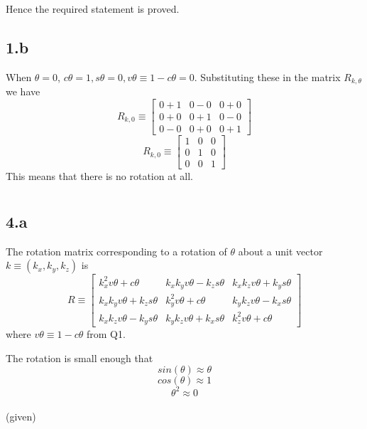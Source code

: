 \documentclass[12pt]{article}
\newcommand{\given}{{\\ \color{blue} \hspace*{\fill}(given)} \\}
\begin{document}
Hence the required statement is proved.

\subsection*{1.b}
When $\theta = 0$, $c\theta = 1, s\theta = 0, v\theta \equiv 1 - c\theta = 0$.
Substituting these in the matrix $ R_{k,\theta} $ we have
\[
  R_{k,0} \equiv
  \begin{bmatrix} 0 + 1 & 0 - 0 & 0 + 0 \\ 0 + 0 & 0 + 1 & 0 - 0 \\ 0 - 0 & 0 + 0 & 0 + 1 \end{bmatrix}
\]
\[
  R_{k,0} \equiv
  \begin{bmatrix} 1 & 0 & 0 \\ 0 & 1 & 0 \\ 0 & 0 & 1 \end{bmatrix}
\]
This means that there is no rotation at all.
\pagebreak

\section{}
\section{}
\pagebreak

\section{}
\subsection*{4.a}
The rotation matrix corresponding to a rotation of $\theta$ about a unit vector $ k \equiv (k_x, k_y, k_z)$ is
\[
  R \equiv
  \begin{bmatrix}
    k_x^2v\theta + c\theta & k_xk_yv\theta - k_zs\theta & k_xk_zv\theta + k_ys\theta\\
    k_xk_yv\theta + k_zs\theta & k_y^2v\theta + c\theta & k_yk_zv\theta - k_xs\theta \\
    k_xk_zv\theta - k_ys\theta & k_yk_zv\theta + k_xs\theta & k_z^2v\theta + c\theta
  \end{bmatrix}
\]
where $v\theta \equiv 1 - c\theta$ from Q1.

The rotation is small enough that
\[
  sin(\theta) \approx \theta
\]
\[
  cos(\theta) \approx 1
\]
\[
  \theta^2 \approx 0
\]
\given
\end{document}
